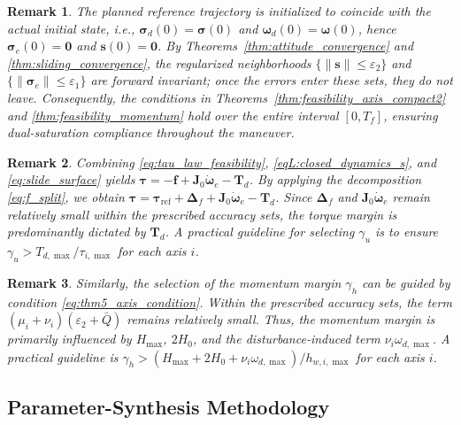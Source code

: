 \documentclass[journal]{new-aiaa}
\newtheorem{remark}{Remark}
\begin{document}
\begin{remark}
The planned reference trajectory is initialized to coincide with the actual initial state, 
i.e., $\boldsymbol{\sigma}_d(0)=\boldsymbol{\sigma}(0)$ and $\boldsymbol{\omega}_d(0)=\boldsymbol{\omega}(0)$, hence
$\boldsymbol{\sigma}_e(0)=\boldsymbol{0}$ and $\boldsymbol{s}(0)=\boldsymbol{0}$.
By Theorems~\ref{thm:attitude_convergence} and \ref{thm:sliding_convergence}, the regularized neighborhoods $\{\|\boldsymbol{s}\|\le\varepsilon_2\}$ and
$\{\|\boldsymbol{\sigma}_e\|\le\varepsilon_1\}$ are forward invariant; once the errors enter these sets, they do not leave.
Consequently, the conditions in Theorems~\ref{thm:feasibility_axis_compact2} and \ref{thm:feasibility_momentum} hold over the entire interval $[0,T_f]$, ensuring dual-saturation compliance throughout the maneuver.
\end{remark}

\begin{remark}
\label{rem:gamma_u_selection}
Combining \eqref{eq:tau_law_feasibility}, \eqref{eqL:closed_dynamics_s}, and \eqref{eq:slide_surface} yields
$\boldsymbol{\tau} = -\boldsymbol{f} + \boldsymbol{J}_0\dot{\boldsymbol{\omega}}_e - \boldsymbol{T}_d$.
By applying the decomposition \eqref{eq:f_split}, 
we obtain $\boldsymbol{\tau} = \boldsymbol{\tau}_{\mathrm{ref}} + \boldsymbol{\Delta}_f + \boldsymbol{J}_0\dot{\boldsymbol{\omega}}_e - \boldsymbol{T}_d$.
Since $\boldsymbol{\Delta}_f$ and $\boldsymbol{J}_0\dot{\boldsymbol{\omega}}_e$ remain relatively small within the prescribed accuracy sets, the torque margin is predominantly dictated by $\boldsymbol{T}_d$.
A practical guideline for selecting $\gamma_u$ is to ensure $\gamma_u > T_{d,\max} / \tau_{i,\max}$ for each axis $i$.
\end{remark}

\begin{remark}
\label{rem:gamma_h_selection}
Similarly, the selection of the momentum margin $\gamma_h$ can be guided by condition \eqref{eq:thm5_axis_condition}.
Within the prescribed accuracy sets, the term $(\mu_i + \nu_i)(\varepsilon_2 + \bar Q)$ remains relatively small.
Thus, the momentum margin is primarily influenced by $H_{\max}$, $2H_0$, and 
the disturbance-induced term $\nu_i \omega_{d,\max}$.
A practical guideline is
$\gamma_h > (H_{\max} + 2H_0 + \nu_i\omega_{d,\max})/h_{w,i,\max}$ for each axis $i$.
\end{remark}


\subsection{Parameter-Synthesis Methodology}
\label{overall_design}
\end{document}
